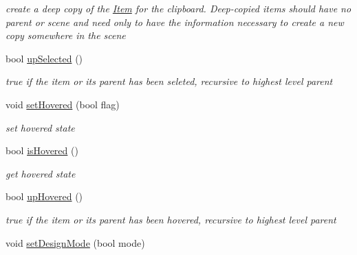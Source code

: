 \begin{DoxyCompactItemize}
\begin{DoxyCompactList}\small\item\em create a deep copy of the \hyperlink{classprim_1_1Item}{Item} for the clipboard. Deep-\/copied items should have no parent or scene and need only to have the information necessary to create a new copy somewhere in the scene \end{DoxyCompactList}\item 
bool \hyperlink{classprim_1_1Item_aa27c998ca6ace4bb07fbff3ad522c37f}{up\+Selected} ()\hypertarget{classprim_1_1Item_aa27c998ca6ace4bb07fbff3ad522c37f}{}\label{classprim_1_1Item_aa27c998ca6ace4bb07fbff3ad522c37f}

\begin{DoxyCompactList}\small\item\em true if the item or its parent has been seleted, recursive to highest level parent \end{DoxyCompactList}\item 
void \hyperlink{classprim_1_1Item_a58b962da55176665e1e53c735f2d3e08}{set\+Hovered} (bool flag)\hypertarget{classprim_1_1Item_a58b962da55176665e1e53c735f2d3e08}{}\label{classprim_1_1Item_a58b962da55176665e1e53c735f2d3e08}

\begin{DoxyCompactList}\small\item\em set hovered state \end{DoxyCompactList}\item 
bool \hyperlink{classprim_1_1Item_a1fc8c6d8a6f62c3e26dc41516d6bb881}{is\+Hovered} ()\hypertarget{classprim_1_1Item_a1fc8c6d8a6f62c3e26dc41516d6bb881}{}\label{classprim_1_1Item_a1fc8c6d8a6f62c3e26dc41516d6bb881}

\begin{DoxyCompactList}\small\item\em get hovered state \end{DoxyCompactList}\item 
bool \hyperlink{classprim_1_1Item_ab6ae17ce9ed2b54fabc9f6016ea0c4e0}{up\+Hovered} ()\hypertarget{classprim_1_1Item_ab6ae17ce9ed2b54fabc9f6016ea0c4e0}{}\label{classprim_1_1Item_ab6ae17ce9ed2b54fabc9f6016ea0c4e0}

\begin{DoxyCompactList}\small\item\em true if the item or its parent has been hovered, recursive to highest level parent \end{DoxyCompactList}\item 
void \hyperlink{classprim_1_1Item_a6384844cdf9abf96f07197e0e654ad0d}{set\+Design\+Mode} (bool mode)\hypertarget{classprim_1_1Item_a6384844cdf9abf96f07197e0e654ad0d}{}\label{classprim_1_1Item_a6384844cdf9abf96f07197e0e654ad0d}


\end{DoxyCompactItemize}
